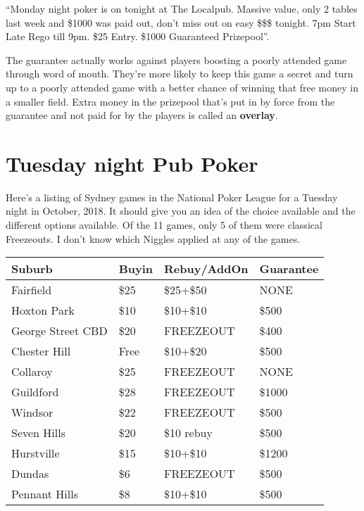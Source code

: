 ``Monday night poker is on tonight at The Localpub. Massive value, only 2
tables last week and \$1000 was paid out, don't miss out on easy
\$\$\$ tonight. 7pm Start Late Rego till 9pm. \$25 Entry. \$1000
Guaranteed Prizepool''.

The guarantee actually works against players
boosting a poorly attended game through word of
mouth. They're more likely to keep this game a secret and turn up to a
poorly attended game with a better chance of winning that free money
in a smaller field. Extra money in the prizepool that's put in by force
from the guarantee and not paid for by the players is called an
\textbf{overlay}.


\section{Tuesday night Pub Poker}

Here's a listing of Sydney games in the National Poker League
for a Tuesday night in October, 2018. It should give you an
idea of the choice available and the different options available.
Of the 11 games, only 5 of them were classical Freezeouts.
I don't know which Niggles applied at any of the games.


\begin{tabular}{|l|l|l|l|} \hline
Suburb & Buyin & Rebuy/AddOn & Guarantee \\ \hline
Fairfield        & \$25 & \$25+\$50 & NONE \\ \hline
Hoxton Park       & \$10 & \$10+\$10 & \$500 \\ \hline
George Street CBD & \$20 & FREEZEOUT & \$400 \\ \hline
Chester Hill & Free & \$10+\$20 & \$500 \\ \hline
Collaroy & \$25 & FREEZEOUT & NONE \\ \hline
Guildford & \$28 & FREEZEOUT & \$1000 \\ \hline
Windsor & \$22 & FREEZEOUT & \$500 \\ \hline
Seven Hills & \$20 & \$10 rebuy & \$500 \\ \hline
Hurstville & \$15 & \$10+\$10 & \$1200 \\ \hline
Dundas & \$6 & FREEZEOUT & \$500 \\ \hline
Pennant Hills & \$8 & \$10+\$10 & \$500 \\ \hline
\end{tabular}

